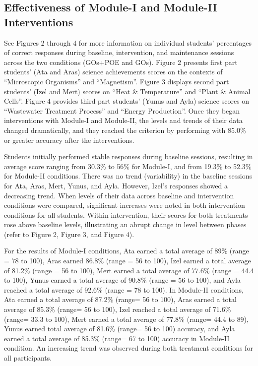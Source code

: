 \documentclass[11.5pt]{sig-alternate} %
\begin{document}
\begin{large}
\subsection*{Effectiveness of Module-I and Module-II Interventions}
See Figures 2 through 4 for more information on individual students’ percentages of correct responses during baseline, intervention, and maintenance sessions across the two conditions (GOs+POE and GOs). Figure 2 presents first part students’ (Ata and Aras) science achievements scores on the contexts of “Microscopic Organisms” and “Magnetism”. Figure 3 displays second part students’ (Izel and Mert) scores on “Heat \& Temperature” and “Plant \& Animal Cells”. Figure 4 provides third part students’ (Yunus and Ayla) science scores on “Wastewater Treatment Process” and “Energy Production”. Once they began interventions with Module-I and Module-II, the levels and trends of their data changed dramatically, and they reached the criterion by performing with 85.0\% or greater accuracy after the interventions. 

Students initially performed stable responses during baseline sessions, resulting in average score ranging from 30.3\% to 56\% for Module-I, and from 19.3\% to 52.3\% for Module-II conditions. There was no trend (variability) in the baseline sessions for Ata, Aras, Mert, Yunus, and Ayla. However, Izel’s responses showed a decreasing trend. When levels of their data across baseline and intervention conditions were compared, significant increases were noted in both intervention conditions for all students. Within intervention, their scores for both treatments rose above baseline levels, illustrating an abrupt change in level between phases (refer to Figure 2, Figure 3, and Figure 4). 

For the results of Module-I conditions, Ata earned a total average of 89\% (range = 78 to 100), Aras earned 86.8\% (range = 56 to 100), Izel earned a total average of 81.2\% (range = 56 to 100), Mert earned a total average of 77.6\% (range = 44.4 to 100), Yunus earned a total average of 90.8\% (range = 56 to 100), and Ayla reached a total average of 92.6\% (range = 78 to 100).  In Module-II conditions, Ata earned a total average of 87.2\% (range= 56 to 100), Aras earned a total average of 85.3\% (range= 56 to 100), Izel reached a total average of 71.6\% (range= 33.3 to 100), Mert earned a total average of 77.8\% (range= 44.4 to 89), Yunus earned total average of 81.6\% (range= 56 to 100) accuracy, and Ayla earned a total average of 85.3\% (range= 67 to 100) accuracy in Module-II condition. An increasing trend was observed during both treatment conditions for all participants. 


\end{large}
\end{document}

